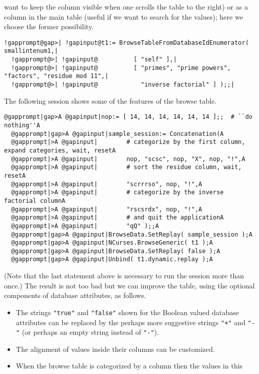 \documentclass[a4paper,11pt]{report}
\begin{document}
{{want to keep the column visible when one scrolls the table to the right) or as
a column in the main table (useful if we want to search for the values); here
we choose the former possibility. 
\begin{Verbatim}[commandchars=!@|,fontsize=\small,frame=single,label=Example]
  !gapprompt@gap>| !gapinput@t1:= BrowseTableFromDatabaseIdEnumerator( smallintenum1,|
  !gapprompt@>| !gapinput@          [ "self" ],|
  !gapprompt@>| !gapinput@          [ "primes", "prime powers", "factors", "residue mod 11",|
  !gapprompt@>| !gapinput@            "inverse factorial" ] );;|
\end{Verbatim}
 The following session shows some of the features of the browse table. 
\begin{Verbatim}[commandchars=@|A,fontsize=\small,frame=single,label=Example]
  @gapprompt|gap>A @gapinput|nop:= [ 14, 14, 14, 14, 14, 14 ];;  # ``do nothing''A
  @gapprompt|gap>A @gapinput|sample_session:= Concatenation(A
  @gapprompt|>A @gapinput|        # categorize by the first column, expand categories, wait, resetA
  @gapprompt|>A @gapinput|        nop, "scsc", nop, "X", nop, "!",A
  @gapprompt|>A @gapinput|        # sort the residue column, wait, resetA
  @gapprompt|>A @gapinput|        "scrrrso", nop, "!",A
  @gapprompt|>A @gapinput|        # categorize by the inverse factorial columnA
  @gapprompt|>A @gapinput|        "rscsrdx", nop, "!",A
  @gapprompt|>A @gapinput|        # and quit the applicationA
  @gapprompt|>A @gapinput|        "qQ" );;A
  @gapprompt|gap>A @gapinput|BrowseData.SetReplay( sample_session );A
  @gapprompt|gap>A @gapinput|NCurses.BrowseGeneric( t1 );A
  @gapprompt|gap>A @gapinput|BrowseData.SetReplay( false );A
  @gapprompt|gap>A @gapinput|Unbind( t1.dynamic.replay );A
\end{Verbatim}
 (Note that the last statement above is necessary to run the session more than
once.) The result is not too bad but we can improve the table, using the
optional components of database attributes, as follows. 
\begin{itemize}
\item  The strings \texttt{"true"} and \texttt{"false"} shown for the Boolean valued database attributes can be replaced by the
perhaps more suggestive strings \texttt{"+"} and \texttt{"-"} (or perhaps an empty string instead of \texttt{"-"}). 
\item  The alignment of values inside their columns can be customized. 
\item  When the browse table is categorized by a column then the values in this

\end{itemize}}}
\end{document}
